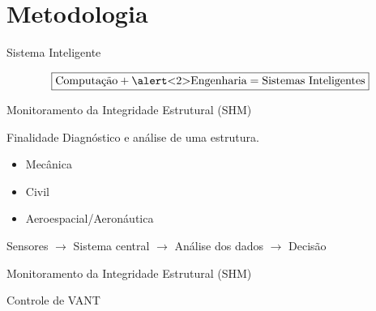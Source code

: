 \section{Metodologia}

\begin{frame}{Sistema Inteligente}

\[\boxed{\text{Computação} + \text{\alert<2>{Engenharia}} = \text{Sistemas Inteligentes}}\] 
    
\end{frame}

\begin{frame}{Monitoramento da Integridade Estrutural (SHM)}

\begin{block}{Finalidade}
    Diagnóstico e análise de uma estrutura.
\end{block} \pause

\begin{itemize}
    \item Mecânica
    \item Civil
    \item Aeroespacial/Aeronáutica
\end{itemize} \pause

Sensores \(\rightarrow\) Sistema central \(\rightarrow\) \alert<3>{Análise dos dados} \(\rightarrow\) Decisão
\end{frame}

\begin{frame}{Monitoramento da Integridade Estrutural (SHM)}
    
\end{frame}

\begin{frame}{Controle de VANT}
    
\end{frame}